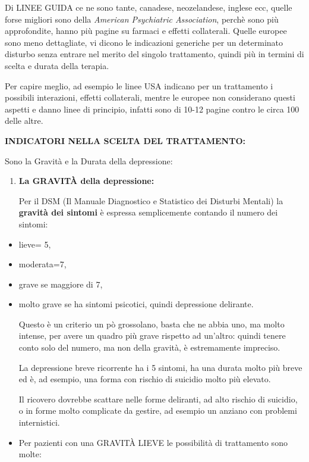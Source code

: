 \documentclass[]{article}
\begin{document}
Di LINEE GUIDA ce ne sono tante, canadese, neozelandese, inglese ecc,
quelle forse migliori sono della \emph{American Psychiatric
Association}, perchè sono più approfondite, hanno più pagine su farmaci
e effetti collaterali. Quelle europee sono meno dettagliate, vi dicono
le indicazioni generiche per un determinato disturbo senza entrare nel
merito del singolo trattamento, quindi più in termini di scelta e durata
della terapia.

Per capire meglio, ad esempio le linee USA indicano per un trattamento i
possibili interazioni, effetti collaterali, mentre le europee non
considerano questi aspetti e danno linee di principio, infatti sono di
10-12 pagine contro le circa 100 delle altre.

\textbf{INDICATORI NELLA SCELTA DEL TRATTAMENTO:}

Sono la Gravità e la Durata della depressione:

\begin{enumerate}
\def\labelenumi{\arabic{enumi}.}
\item
  \textbf{La GRAVITÀ della depressione: }

  Per il DSM (Il Manuale Diagnostico e Statistico dei Disturbi Mentali)
  la \textbf{gravità dei sintomi} è espressa semplicemente contando il
  numero dei sintomi:
\end{enumerate}

\begin{itemize}
\item
  lieve= 5,
\item
  moderata=7,
\item
  grave se maggiore di 7,
\item
  molto grave se ha sintomi psicotici, quindi depressione delirante.

  Questo è un criterio un pò grossolano, basta che ne abbia uno, ma
  molto intense, per avere un quadro più grave rispetto ad un'altro:
  quindi tenere conto solo del numero, ma non della gravità, è
  estremamente impreciso.

  La depressione breve ricorrente ha i 5 sintomi, ha una durata molto
  più breve ed è, ad esempio, una forma con rischio di suicidio molto
  più elevato.

  Il ricovero dovrebbe scattare nelle forme deliranti, ad alto rischio
  di suicidio, o in forme molto complicate da gestire, ad esempio un
  anziano con problemi internistici.
\end{itemize}

\begin{itemize}
\item
  Per pazienti con una GRAVITÀ LIEVE le possibilità di trattamento sono
  molte:
\end{itemize}
\end{document}
